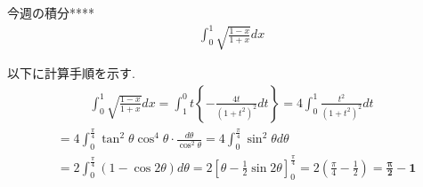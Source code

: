 \documentclass[main]{subfiles}
\begin{document}

\begin{mondai}{3}{今週の積分}{****}
    \begin{align*}
        \int_0^1 \sqrt{\frac{1-x}{1+x}} dx
    \end{align*}
\end{mondai}


\solutionhead
\hfill
以下に計算手順を示す.
\hfill\
\begin{align*}
    \int ^1_0 \sqrt{\frac{1-x}{1+x}} dx
        = \int ^0_1 t \left\{ -\frac{4t}{(1+t^2)^2}dt \right\}
        = 4 \int ^1_0 \frac{t^2}{(1+t^2)^2}dt
\end{align*}
\begin{align*}
        &= 4\int^{\frac{\pi}{4}}_0 \tan^2\theta\cos^4\theta\cdot\frac{d\theta}{\cos^2\theta}
        = 4\int^{\frac{\pi}{4}}_0 \sin^2\theta d\theta \\
        &= 2\int^{\frac{\pi}{4}}_0 \left(1-\cos 2\theta\right) d\theta
        = 2\left[ \theta-\frac{1}{2}\sin 2\theta \right]_0^{\frac{\pi}{4}}
        = 2\left( \frac{\pi}{4}-\frac{1}{2} \right)
        = \boldsymbol{\frac{\pi}{2}-1}
\end{align*}
\end{document}
